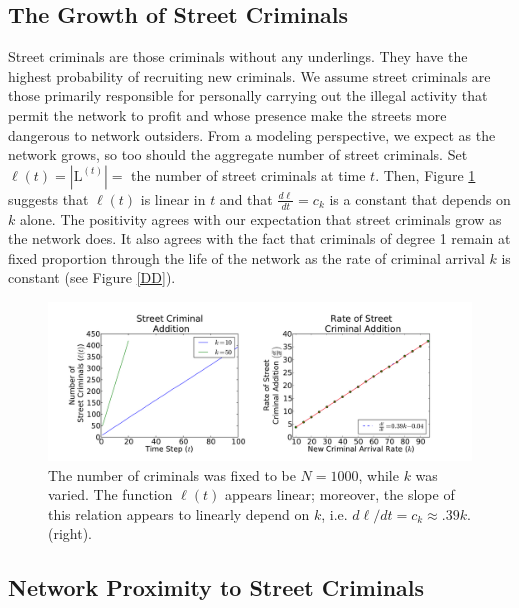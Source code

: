 \documentclass[11pt]{article}
\renewcommand{\L}{\mathrm{L}}
\renewcommand{\l}{\ell}
\theoremstyle{plain}
\theoremstyle{definition}
\begin{document}
\subsection*{The Growth of Street Criminals}
Street criminals are those criminals without any underlings.  They have the highest probability of recruiting new criminals.  We assume street criminals are those primarily responsible for personally carrying out the illegal activity that permit the network to profit and whose presence make the streets more dangerous to network outsiders.  From a modeling perspective, we expect as the network grows, so too should the aggregate number of street criminals.  Set $\l(t) = |\L^{(t)}| =$ the number of street criminals at time $t$.  Then, Figure \ref{leaf} suggests that $\l(t)$ is linear in $t$ and that $\frac{d \l}{d t} = c_k$ is a constant that depends on $k$ alone.  The positivity agrees with our expectation that street criminals grow as the network does.  It also agrees with the fact that criminals of degree 1 remain at fixed proportion through the life of the network as the rate of criminal arrival $k$ is constant (see Figure \ref{DD}).

 \begin{figure}
 \centering
\includegraphics[width=\linewidth]{leafstats.pdf}
\caption{The number of criminals was fixed to be $N = 1000$, while $k$ was varied.  The function $\l(t)$ appears linear; moreover, the slope of this relation appears to linearly depend on $k$, i.e. $d \l/d t = c_k\approx .39k$. (right).}
\label{leaf}
\end{figure}


\subsection*{Network Proximity to Street Criminals}
\end{document}
